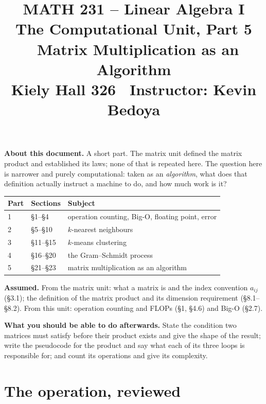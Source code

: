 \documentclass[11pt]{article}
\title{\vspace{-1.2cm}\textbf{\sffamily MATH 231 -- Linear Algebra I}\\[4pt]
       {\large\sffamily The Computational Unit, Part 5 \textbullet\
        Matrix Multiplication as an Algorithm}\\[2pt]
       {\normalsize\sffamily Kiely Hall 326 \textbullet\
        Instructor: Kevin Bedoya}}
\author{}
\date{}
\theoremstyle{plain}
\theoremstyle{definition}
\theoremstyle{remark}
\begin{document}
\setcounter{section}{20}  %
\maketitle
\vspace{-1.6cm}

\noindent\textbf{About this document.} A short part. The matrix unit defined the
matrix product and established its laws; none of that is repeated here. The
question here is narrower and purely computational: taken as an
\emph{algorithm}, what does that definition actually instruct a machine to do,
and how much work is it?

\begin{center}
\renewcommand{\arraystretch}{1.2}
\begin{tabular}{@{}l l l@{}}
\toprule
\textbf{Part} & \textbf{Sections} & \textbf{Subject} \\
\midrule
1 & \S1--\S4    & operation counting, Big-O, floating point, error \\
2 & \S5--\S10   & $k$-nearest neighbours \\
3 & \S11--\S15  & $k$-means clustering \\
4 & \S16--\S20  & the Gram--Schmidt process \\
5 & \S21--\S23  & matrix multiplication as an algorithm \\
\bottomrule
\end{tabular}
\end{center}

\medskip
\noindent\textbf{Assumed.} From the matrix unit: what a matrix is and the
index convention $a_{ij}$ (\S3.1); the definition of the matrix product and its
dimension requirement (\S8.1--\S8.2). From this unit: operation counting and
FLOPs (\S1, \S4.6) and Big-O (\S2.7).

\medskip
\noindent\textbf{What you should be able to do afterwards.} State the condition
two matrices must satisfy before their product exists and give the shape of the
result; write the pseudocode for the product and say what each of its three
loops is responsible for; and count its operations and give its complexity.

\section{The operation, reviewed}
\end{document}
